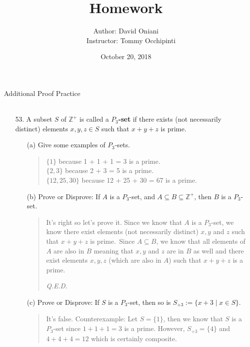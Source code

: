\documentclass[12pt, a4paper]{article}                      %
\title{\bf{Homework \textnumero 8}}
\author{Author: David Oniani
\\
\ \ \ Instructor: Tommy Occhipinti}
\date{October 20, 2018}
\begin{document}
\maketitle

{\Large Additional Proof Practice}
\\\\
\begin{itemize}
\item[53.]
A subset $S$ of $\mathbb{Z}^{+}$ is called a $P_3$\textbf{-set} if there exists (not necessarily distinct) elements
$x, y, z \in S$ such that $x + y + z$ is prime.

\begin{itemize}
\item[(a)]
Give some examples of $P_3$-sets.
\begin{quote}
$\{1\}$ because 1 + 1 + 1 = 3 is a prime.\\
$\{2, 3\}$ because 2 + 3 = 5 is a prime.\\
$\{12, 25, 30\}$ because 12 + 25 + 30 = 67 is a prime.
\end{quote}

\item[]

\item[(b)]
Prove or Disprove: If $A$ is a $P_3$-set, and $A \subseteq B \subseteq \mathbb{Z}^+$, then $B$ is a $P_3$-set.
\begin{quote}
It's right so let's prove it.
Since we know that $A$ is a $P_3$-set, we know there exist elements (not necessarily distinct) $x,y$ and $z$ such that
$x + y + z$ is prime.\ Since $A \subseteq B$, we know that all elements of $A$ are also in $B$ meaning that $x,y$ and $z$
are in $B$ as well and there exist elements $x,y,z$ (which are also in $A$) such that $x + y + z$ is a prime.
\begin{flushright}
\textit{Q.E.D.}
\end{flushright}
\end{quote}

\item[]

\item[(c)]
Prove or Disprove: If $S$ is a $P_3$-set, then so is $S_{+3} := \{x + 3 \mid x \in S\}$.
\begin{quote}
It's false. Counterexample: Let $S = \{1\}$, then we know that $S$ is a $P_3$-set since $1 + 1 + 1 = 3$
is a prime. However, $S_{+3} = \{4\}$ and $4 + 4 + 4 = 12$ which is certainly composite.
\end{quote}


\end{itemize}
\end{itemize}
\end{document}
